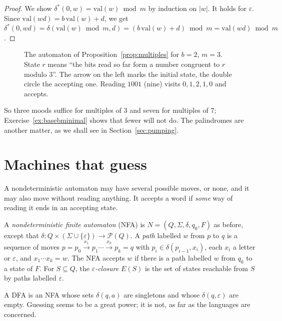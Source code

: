 \begin{proof}
We show $\delta^*(0,w)=\mathrm{val}(w)\bmod m$ by induction on $|w|$. It holds for $\varepsilon$. Since $\mathrm{val}(wd)=b\,\mathrm{val}(w)+d$, we get $\delta^*(0,wd)=\delta(\mathrm{val}(w)\bmod m,d)=(b\,\mathrm{val}(w)+d)\bmod m=\mathrm{val}(wd)\bmod m$.
\end{proof}

\begin{figure}[ht]
\centering
{}
\caption{The automaton of Proposition~\ref{prop:multiples} for $b=2$, $m=3$. State $r$ means ``the bits read so far form a number congruent to $r$ modulo $3$''. The arrow on the left marks the initial state, the double circle the accepting one. Reading $1001$ (nine) visits $0,1,2,1,0$ and accepts.}
\label{fig:mod3}
\end{figure}

So three moods suffice for multiples of $3$ and seven for multiples of $7$; Exercise~\ref{ex:basebminimal} shows that fewer will not do. The palindromes are another matter, as we shall see in Section~\ref{sec:pumping}.

\section{Machines that guess}\label{sec:nfa}

A nondeterministic automaton may have several possible moves, or none, and it may also move without reading anything. It accepts a word if \emph{some} way of reading it ends in an accepting state.

\begin{definition}\label{def:nfa}
A \emph{nondeterministic finite automaton} (NFA) is $N=(Q,\Sigma,\delta,q_0,F)$ as before, except that $\delta:Q\times(\Sigma\cup\{\varepsilon\})\to\mathcal P(Q)$. A \emph{path} labelled $w$ from $p$ to $q$ is a sequence of moves $p=p_0\xrightarrow{x_1}p_1\cdots\xrightarrow{x_k}p_k=q$ with $p_i\in\delta(p_{i-1},x_i)$, each $x_i$ a letter or $\varepsilon$, and $x_1\cdots x_k=w$. The NFA accepts $w$ if there is a path labelled $w$ from $q_0$ to a state of $F$. For $S\subseteq Q$, the \emph{$\varepsilon$-closure} $E(S)$ is the set of states reachable from $S$ by paths labelled $\varepsilon$.
\end{definition}

A DFA is an NFA whose sets $\delta(q,a)$ are singletons and whose $\delta(q,\varepsilon)$ are empty. Guessing seems to be a great power; it is not, as far as the languages are concerned.

